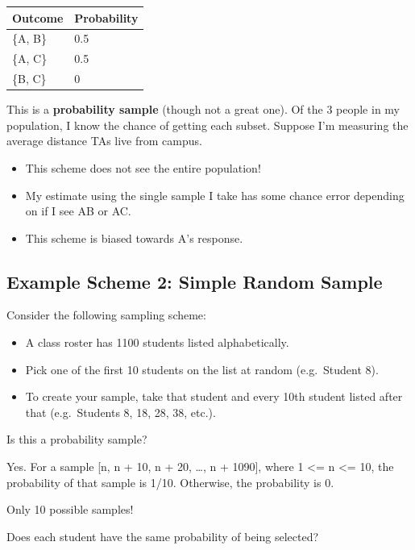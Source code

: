 \documentclass[
  letterpaper,
  DIV=11,
  numbers=noendperiod]{scrreprt}
\providecommand{\tightlist}{%
  \setlength{\itemsep}{0pt}\setlength{\parskip}{0pt}}\usepackage{longtable,booktabs,array}
\begin{document}
\begin{longtable}[]{@{}ll@{}}
\toprule\noalign{}
Outcome & Probability \\
\midrule\noalign{}
\endhead
\bottomrule\noalign{}
\endlastfoot
\{A, B\} & 0.5 \\
\{A, C\} & 0.5 \\
\{B, C\} & 0 \\
\end{longtable}

This is a \textbf{probability sample} (though not a great one). Of the 3
people in my population, I know the chance of getting each subset.
Suppose I'm measuring the average distance TAs live from campus.

\begin{itemize}
\tightlist
\item
  This scheme does not see the entire population!
\item
  My estimate using the single sample I take has some chance error
  depending on if I see AB or AC.
\item
  This scheme is biased towards A's response.
\end{itemize}

\subsection{Example Scheme 2: Simple Random
Sample}\label{example-scheme-2-simple-random-sample}

Consider the following sampling scheme:

\begin{itemize}
\tightlist
\item
  A class roster has 1100 students listed alphabetically.
\item
  Pick one of the first 10 students on the list at random (e.g.~Student
  8).
\item
  To create your sample, take that student and every 10th student listed
  after that (e.g.~Students 8, 18, 28, 38, etc.).
\end{itemize}

Is this a probability sample?

Yes. For a sample {[}n, n + 10, n + 20, \ldots, n + 1090{]}, where 1
\textless= n \textless= 10, the probability of that sample is 1/10.
Otherwise, the probability is 0.

Only 10 possible samples!

Does each student have the same probability of being selected?
\end{document}
